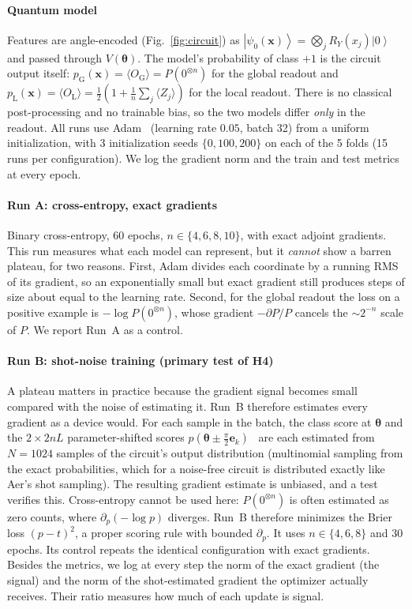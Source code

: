 \documentclass[conference]{IEEEtran}
\providecommand{\ket}[1]{\left|#1\right\rangle}
\begin{document}
\paragraph*{Quantum model} Features are angle-encoded (Fig.~\ref{fig:circuit}) as
$\ket{\psi_0(\mathbf x)}=\bigotimes_j R_Y(x_j)\ket 0$ and passed through
$V(\boldsymbol\theta)$. The model's probability of class $+1$ is the circuit
output itself: $p_{\mathrm G}(\mathbf x)=\langle O_{\mathrm G}\rangle=P(0^{\otimes n})$
for the global readout and
$p_{\mathrm L}(\mathbf x)=\langle O_{\mathrm L}\rangle=\tfrac12(1+\tfrac1n\sum_j\langle Z_j\rangle)$
for the local readout. There is no classical post-processing and no trainable
bias, so the two models differ \emph{only} in the readout. All runs use Adam~\cite{kingma2015}
(learning rate $0.05$, batch 32) from a uniform initialization, with 3
initialization seeds $\{0,100,200\}$ on each of the 5 folds (15 runs per
configuration). We log the gradient norm and the train and test metrics at
every epoch.

\paragraph*{Run A: cross-entropy, exact gradients} Binary cross-entropy, 60
epochs, $n\in\{4,6,8,10\}$, with exact adjoint gradients. This run measures
what each model can represent, but it \emph{cannot} show a barren plateau, for
two reasons. First, Adam divides each coordinate by a running RMS of its
gradient, so an exponentially small but exact gradient still produces steps
of size about equal to the learning rate. Second, for the global readout the
loss on a positive example is $-\log P(0^{\otimes n})$, whose gradient
$-\partial P/P$ cancels the $\sim2^{-n}$ scale of $P$. We report Run~A as a
control.

\paragraph*{Run B: shot-noise training (primary test of H4)}\label{sec:shots}
A plateau matters in practice because the gradient signal becomes small
compared with the noise of estimating it. Run~B therefore estimates every
gradient as a device would. For each sample in the batch, the class score at
$\boldsymbol\theta$ and the $2\times2nL$ parameter-shifted scores
$p(\boldsymbol\theta\pm\frac{\pi}{2}\mathbf e_k)$~\cite{schuld2019} are each
estimated from $N=1024$ samples of the circuit's output distribution
(multinomial sampling from the exact probabilities, which for a noise-free
circuit is distributed exactly like Aer's shot sampling). The resulting
gradient estimate is unbiased, and a test verifies this.
Cross-entropy cannot be used here: $P(0^{\otimes n})$ is often estimated as
zero counts, where $\partial_p(-\log p)$ diverges. Run~B therefore minimizes the Brier loss
$(p-t)^2$, a proper scoring rule with bounded $\partial_p$. It uses
$n\in\{4,6,8\}$ and 30 epochs. Its control repeats the identical
configuration with exact gradients. Besides the metrics, we log at every step
the norm of the exact gradient (the signal) and the norm of the
shot-estimated gradient the optimizer actually receives. Their ratio measures
how much of each update is signal.
\end{document}
